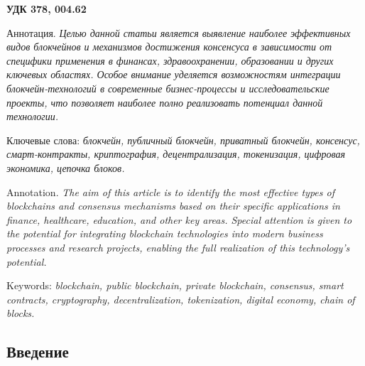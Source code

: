 \documentclass{mirea-article}
\begin{document}
\textbf{УДК 378, 004.62}





Аннотация. {\itshape Целью данной статьи является выявление наиболее эффективных видов блокчейнов и механизмов достижения консенсуса в зависимости от специфики применения в финансах, здравоохранении, образовании и других ключевых областях. Особое внимание уделяется возможностям интеграции блокчейн-технологий в современные бизнес-процессы и исследовательские проекты, что позволяет наиболее полно реализовать потенциал данной технологии.}

Ключевые слова: \textit{блокчейн, публичный блокчейн, приватный блокчейн, консенсус, смарт-контракты, криптография, децентрализация, токенизация, цифровая экономика, цепочка блоков.}


Annotation. {\itshape The aim of this article is to identify the most effective types of blockchains and consensus mechanisms based on their specific applications in finance, healthcare, education, and other key areas. Special attention is given to the potential for integrating blockchain technologies into modern business processes and research projects, enabling the full realization of this technology's potential.}

Keywords: \textit{blockchain, public blockchain, private blockchain, consensus, smart contracts, cryptography, decentralization, tokenization, digital economy, chain of blocks.}

\subsection*{Введение}
\label{sec:introduction}
\end{document}
